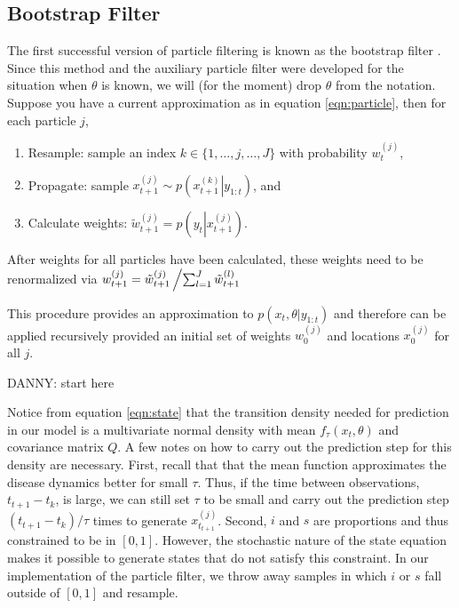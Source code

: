 \documentclass{article}
\newcommand{\danny}[1]{{\color{blue}DANNY: #1}}
\begin{document}
\subsection{Bootstrap Filter}

The first successful version of particle filtering is known as the bootstrap filter \citep{Gord:Salm:Smit:nove:1993}. Since this method and the auxiliary particle filter were developed for the situation when $\theta$ is known, we will (for the moment) drop $\theta$ from the notation. Suppose you have a current approximation as in equation \eqref{eqn:particle}, then for each particle $j$,

\begin{enumerate}
\item Resample: sample an index $k\in \{1,\ldots,j,\ldots,J\}$ with probability $w_t^{(j)}$,
\item Propagate: sample $x_{t+1}^{(j)} \sim p\left(\left. x_{t+1}^{(k)}\right|y_{1:t}\right)$, and
\item Calculate weights: $\tilde{w}_{t+1}^{(j)} = p\left(y_{t}\left|x_{t+1}^{(j)}\right.\right)$.
\end{enumerate}

\noindent After weights for all particles have been calculated, these weights need to be renormalized via $w_{t+1}^{(j)} = \tilde{w}_{t+1}^{(j)}\left/ \sum_{l=1}^J \tilde{w}_{t+1}^{(l)} \right.$

This procedure provides an approximation to $p(x_t,\theta| y_{1:t})$ and therefore can be applied recursively provided an initial set of weights $w_0^{(j)}$ and locations $x_0^{(j)}$ for all $j$.

\danny{start here}

Notice from equation \eqref{eqn:state} that the transition density needed for prediction in our model is a multivariate normal density with mean $f_\tau(x_t,\theta)$ and covariance matrix $Q$.  A few notes on how to carry out the prediction step for this density are necessary. First, recall that that the mean function approximates the disease dynamics better for small $\tau$.  Thus, if the time between observations, $t_{t+1} - t_k$, is large, we can still set $\tau$ to be small and carry out the prediction step $(t_{t+1} - t_k) / \tau$ times to generate $x_{t_{t+1}}^{(j)}$.  Second, $i$ and $s$ are proportions and thus constrained to be in $[0,1]$.  However, the stochastic nature of the state equation makes it possible to generate states that do not satisfy this constraint.  In our implementation of the particle filter, we throw away samples in which $i$ or $s$ fall outside of $[0,1]$ and resample.
\end{document}
